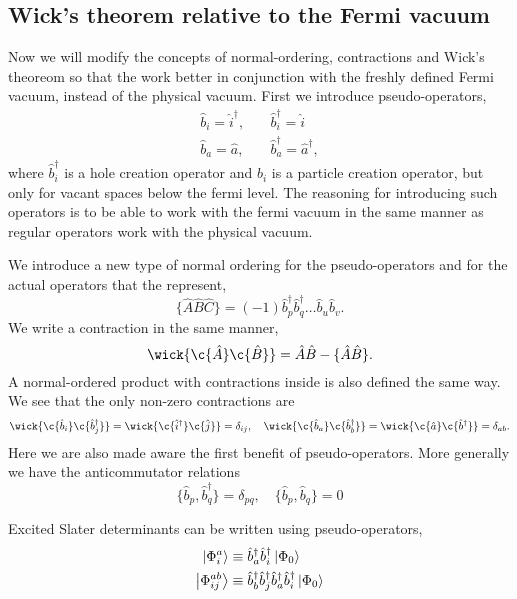 	\subsection{Wick's theorem relative to the Fermi vacuum}

		Now we will modify the concepts of normal-ordering, contractions and Wick's 
        theoreom so that the work better in conjunction with the freshly defined Fermi
        vacuum, instead of the physical vacuum.
		First we introduce pseudo-operators,
		\begin{equation}
			\begin{aligned}
				\hat{b}_i = \hat{i}^\dagger, &\quad \hat{b}_i^\dagger = \hat{i} \\
				\hat{b}_a = \hat{a}, &\quad \hat{b}_a^\dagger = \hat{a}^\dagger,
			\end{aligned}
		\end{equation}
		where $\hat{b}_i^\dagger$ is a hole creation operator and $\hat{b}_i$ is a particle
		creation operator, but only for vacant spaces below the fermi level. The reasoning 
		for introducing such operators is to be able to work with the fermi vacuum in the 
		same manner as regular operators work with the physical vacuum.

		We introduce a new type of normal ordering for the pseudo-operators and for the
		actual operators that the represent,
		\begin{equation}
			\{\hat{A}\hat{B}\hat{C} \} 
				= (-1)\hat{b}_p^\dagger\hat{b}_q^\dagger \dots \hat{b}_u \hat{b}_v.
		\end{equation}
		We write a contraction in the same manner,
		\begin{equation}
			\wick{\c{\hat{A}}\c{\hat{B}}} = \hat{A}\hat{B} - \{\hat{A}\hat{B}\}.
		\end{equation}
		A normal-ordered product with contractions inside is also defined the same 
		way. We see that the only non-zero contractions are
		\begin{equation}
			\wick{\c{\hat{b}_i}\c{\hat{b}_j^\dagger}} =	
			\wick{\c{\hat{i}^\dagger}\c{\hat{j}}} = \delta_{ij}, \quad
			\wick{\c{\hat{b}_a}\c{\hat{b}_b^\dagger}} =
			\wick{\c{\hat{a}}\c{\hat{b}^\dagger}} = \delta_{ab}.
		\end{equation}
		Here we are also made aware the first benefit of pseudo-operators. More generally 
		we have the anticommutator relations
		\begin{equation}
			\{\hat{b}_p, \hat{b}_q^\dagger\} = \delta_{pq}, \quad
			\{\hat{b}_p, \hat{b}_q\} = 0
		\end{equation}

		Excited Slater determinants can be written using pseudo-operators,
		\begin{align}
			\ket{\Phi_i^a} &\equiv \hat{b}_a^\dagger\hat{b}_i^\dagger \ket{\Phi_0} \\
			\ket{\Phi_{ij}^{ab}} &\equiv 
				\hat{b}_b^\dagger \hat{b}_j^\dagger \hat{b}_a^\dagger \hat{b}_i^\dagger 
				\ket{\Phi_0}
		\end{align}

